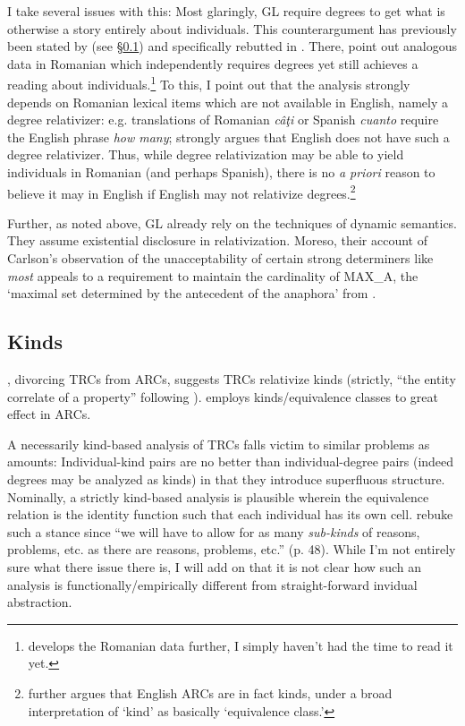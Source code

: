 \documentclass[11pt]{article}
\begin{document}
I take several issues with this: Most glaringly, GL require degrees to get what is otherwise a story entirely about individuals. This counterargument has previously been stated by \citet{mcnallyDPInternalOnlyAmount2008} (see \S\ref{sec:kinds}) and specifically rebutted in \citet{grosuEntitydenotingAmountRelatives2015}. There, \citeauthor{grosuEntitydenotingAmountRelatives2015} point out analogous data in Romanian which independently requires degrees yet still achieves a reading about individuals.\footnote{\citet{grosuSelectedAspectsAmount2015} develops the Romanian data further, I simply haven't had the time to read it yet.} To this, I point out that the analysis strongly depends on Romanian lexical items which are not available in English, namely a degree relativizer: e.g. translations of Romanian \textit{c\^a\c ti} or Spanish \textit{cuanto} require the English phrase \textit{how many}; \citet{mendiaAmountRelativesRedux2017} strongly argues that English does not have such a degree relativizer. Thus, while degree relativization may be able to yield individuals in Romanian (and perhaps Spanish), there is no \textit{a priori} reason to believe it may in English if English may not relativize degrees.\footnote{\citet{mendiaAmountRelativesRedux2017} further argues that English ARCs are in fact kinds, under a broad interpretation of `kind' as basically `equivalence class.'}

Further, as noted above, GL already rely on the techniques of dynamic semantics. They assume existential disclosure in relativization. Moreso, their account of Carlson's observation of the unacceptability of certain strong determiners like \textit{most} appeals to a requirement to maintain the cardinality of MAX_A, the `maximal set determined by the antecedent of the anaphora' from \citet{kadmonUniqueNonuniqueReference1992}.

\subsection{Kinds}\label{sec:kinds}
\citet{mcnallyDPInternalOnlyAmount2008}, divorcing TRCs from ARCs, suggests TRCs relativize kinds (strictly, ``the entity correlate of a property'' following \cite{mcnallyInterpretationEnglishExistential1992}). \citet{mendiaAmountRelativesRedux2017} employs kinds/equivalence classes to great effect in ARCs.

A necessarily kind-based analysis of TRCs falls victim to similar problems as amounts: Individual-kind pairs are no better than individual-degree pairs (indeed degrees may be analyzed as kinds) in that they introduce superfluous structure. Nominally, a strictly kind-based analysis is plausible wherein the equivalence relation is the identity function such that each individual has its own cell. \citet{grosuAmountRelatives2017} rebuke such a stance since ``we will have to allow for as many \textit{sub-kinds} of reasons, problems, etc. as there are reasons, problems, etc.'' (p. 48). While I'm not entirely sure what there issue there is, I will add on that it is not clear how such an analysis is functionally/empirically different from straight-forward invidual abstraction.
\end{document}
